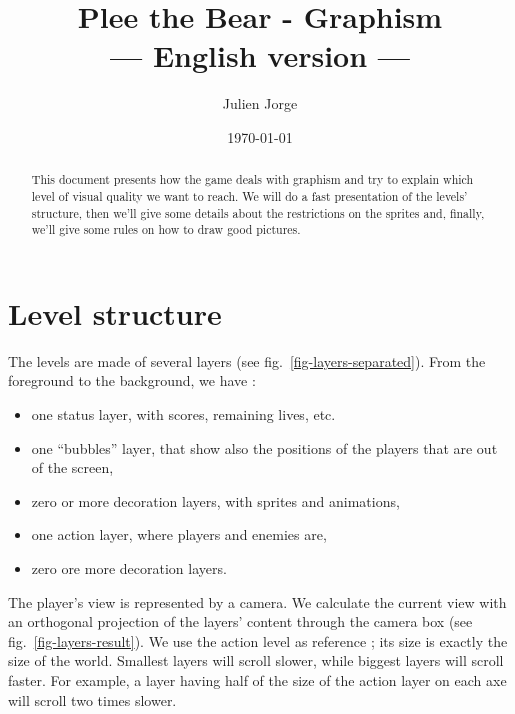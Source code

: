 \documentclass{article}
\title{Plee the Bear - Graphism \\--- English version ---}
\author{Julien Jorge}
\date{\today}
\begin{document}

\maketitle
\begin{abstract}
This document presents how the game deals with graphism and try to
explain which level of visual quality we want to reach. We will do a
fast presentation of the levels' structure, then we'll give some
details about the restrictions on the sprites and, finally, we'll give
some rules on how to draw good pictures.
\end{abstract}

\tableofcontents
\newpage

\section{Level structure}
The levels are made of several layers (see
fig.~\ref{fig-layers-separated}). From the foreground to the
background, we have :
\begin{itemize}
\item one status layer, with scores, remaining lives, etc.
\item one ``bubbles'' layer, that show also the positions of the
      players that are out of the screen,
\item zero or more decoration layers, with sprites and animations,
\item one action layer, where players and enemies are,
\item zero ore more decoration layers.
\end{itemize}

The player's view is represented by a camera. We calculate the
current view with an orthogonal projection of the layers' content
through the camera box (see fig.~\ref{fig-layers-result}). We use the
action level as reference ; its size is exactly the size of the
world. Smallest layers will scroll slower, while biggest layers will
scroll faster. For example, a layer having half of the size of the
action layer on each axe will scroll two times slower.
\end{document}
